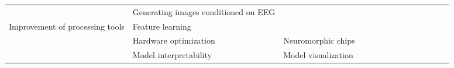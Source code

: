 \begin{tabular}{p{1.5cm}p{1.5cm}p{1.5cm}p{1.5cm}p{0.6cm}p{0.6cm}p{0.6cm}p{0.6cm}p{0.6cm}p{0.6cm}p{0.6cm}p{0.6cm}p{0.6cm}p{0.6cm}}
                                & Generating images conditioned on EEG &   &   &                                                             &                                                                                                                             &                                                                        &                                      &                                                            &       \cite{Lee2018} &                       &              \cite{Palazzo2017} &                         &                                                                      \\
Improvement of processing tools & Feature learning &   &   &                          \cite{Wen2018, Stober2015, Li2015} &                                                                                                        \cite{Bashivan2016a} &                                                                        &                                      &                                                            &                      &                       &                                 &                         &                                                                      \\
                                & Hardware optimization & Neuromorphic chips &   &                                                             &                                                                                                            \cite{Nurse2016} &                                                                        &                                      &                                                            &                      &      \cite{Yepes2017} &                                 &                         &                                                                      \\
                                & Model interpretability & Model visualization &   &                                                             &                                                                                                        \cite{Hartmann2018b} &                                                                        &                                      &                                                            &                      &      \cite{Sturm2016} &                                 &                         &                                                                      \\

\end{tabular}
